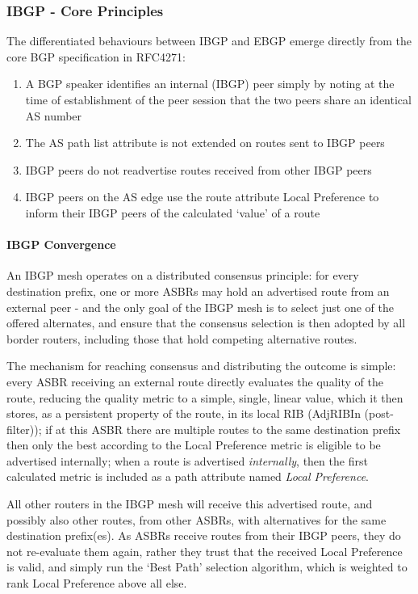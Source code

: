 \subsubsection{IBGP - Core Principles}

The differentiated behaviours between IBGP and EBGP emerge directly from the core BGP specification in RFC4271:
\begin{enumerate}
	\item A BGP speaker identifies an internal (IBGP) peer simply by noting at the time of establishment of the peer session that the two peers share an identical AS number
	\item The AS path list attribute is not extended on routes sent to IBGP peers
	\item IBGP peers do not readvertise routes received from other IBGP peers
	\item IBGP peers on the AS edge use the route attribute Local Preference to inform their IBGP peers of the calculated `value' of a route
\end{enumerate}

\paragraph{IBGP Convergence}

An IBGP mesh operates on a distributed consensus principle: for every
destination prefix, one or more ASBRs may hold an advertised route from an
external peer - and the only goal of the IBGP mesh is to select just one of the offered
alternates, and ensure that the consensus selection is then adopted by all border
routers, including those that hold competing alternative routes.

The mechanism for reaching consensus and distributing the outcome is simple:
every ASBR receiving an external route directly evaluates the quality of the route, reducing the quality metric to a simple, single, linear value, which it then stores, as a persistent property of the route, in  its local RIB (AdjRIBIn (post-filter)); if at this ASBR there are multiple routes to the same destination prefix then only the best according to the Local Preference metric is eligible to be advertised internally; when a route is advertised \textit{internally}, then the first calculated metric is included as a path attribute named \textit{Local Preference}.

All other routers in the IBGP mesh will receive this advertised route, and possibly also
other routes, from other ASBRs, with alternatives for the same destination prefix(es).
As ASBRs receive routes from their IBGP peers, they do not re-evaluate them again, rather they trust that the received Local Preference is valid, and simply run the `Best Path' selection algorithm, which is weighted to rank Local Preference above all else.

